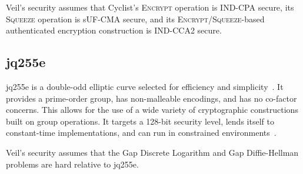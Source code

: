 Veil's security assumes that Cyclist's \textsc{Encrypt} operation is IND-CPA secure, its
\textsc{Squeeze} operation is sUF-CMA secure, and its
\textsc{Encrypt}/\textsc{Squeeze}-based authenticated encryption construction is IND-CCA2 secure.

\subsection{jq255e}\label{subsec:jq255e}

jq255e is a double-odd elliptic curve selected for efficiency and simplicity~\cite{pornin2022}.
It provides a prime-order group, has non-malleable encodings, and has no co-factor concerns.
This allows for the use of a wide variety of cryptographic constructions built on group operations.
It targets a 128-bit security level, lends itself to constant-time implementations, and can run in constrained
environments~\cite{pornin2022do}.

Veil's security assumes that the Gap Discrete Logarithm and Gap Diffie-Hellman problems are hard relative to
jq255e.
